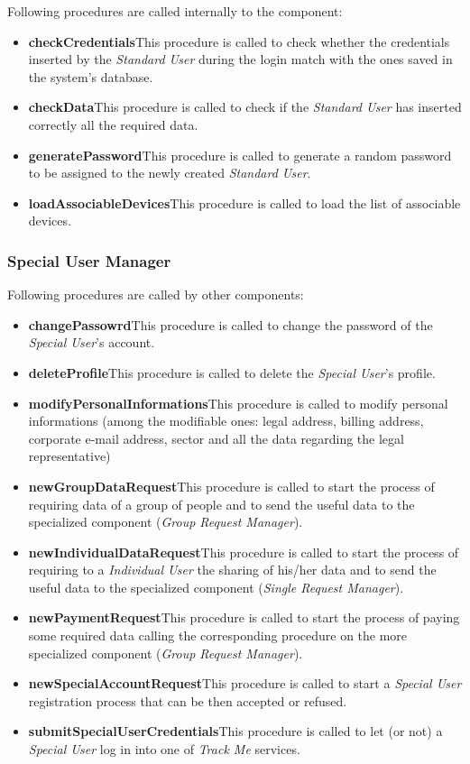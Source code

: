 \myparagraph{}
Following procedures are called internally to the component:
\begin{itemize}
  \item \textbf{checkCredentials}\quad This procedure is called to check whether the credentials inserted by the \textit{Standard User} during the login match with the ones saved in the system's database.
  \item \textbf{checkData}\quad This procedure is called to check if the \textit{Standard User} has inserted correctly all the required data.
  \item \textbf{generatePassword}\quad This procedure is called to generate a random password to be assigned to the newly created \textit{Standard User}.
  \item \textbf{loadAssociableDevices}\quad This procedure is called to load the list of associable devices.
\end{itemize}

\subsubsection{Special User Manager}
Following procedures are called by other components:
\begin{itemize}
  \item \textbf{changePassowrd}\quad This procedure is called to change the password of the \textit{Special User}'s account.
  \item \textbf{deleteProfile}\quad This procedure is called to delete the \textit{Special User}'s profile.
  \item \textbf{modifyPersonalInformations}\quad This procedure is called to modify personal informations (among the modifiable ones:  legal address, billing address, corporate e-mail address, sector and all the data regarding the legal representative)
  \item \textbf{newGroupDataRequest}\quad This procedure is called to start the process of requiring data of a group of people and to send the useful data to the specialized component (\textit{Group Request Manager}).
  \item \textbf{newIndividualDataRequest}\quad This procedure is called to start the process of requiring to a \textit{Individual User} the sharing of his/her data and to send the useful data to the specialized component (\textit{Single Request Manager}).
  \item \textbf{newPaymentRequest}\quad This procedure is called to start the process of paying some required data calling the corresponding procedure on the more specialized component (\textit{Group Request Manager}).
  \item \textbf{newSpecialAccountRequest}\quad This procedure is called to start a \textit{Special User} registration process that can be then accepted or refused.
  \item \textbf{submitSpecialUserCredentials}\quad This procedure is called to let (or not) a \textit{Special User} log in into one of \textit{Track Me} services.
\end{itemize}


